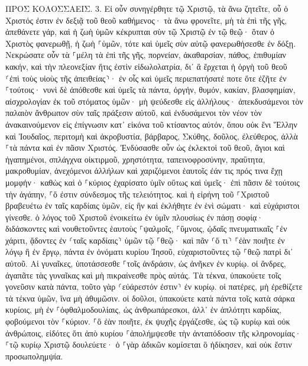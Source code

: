 \documentclass[twoside, 9pt]{extreport}
\begin{document}
ΠΡΟΣ ΚΟΛΟΣΣΑΕΙΣ.
3.
Εἰ οὖν συνηγέρθητε τῷ Χριστῷ, τὰ ἄνω ζητεῖτε, οὗ ὁ Χριστός ἐστιν ἐν δεξιᾷ τοῦ θεοῦ καθήμενος· 
τὰ ἄνω φρονεῖτε, μὴ τὰ ἐπὶ τῆς γῆς, 
ἀπεθάνετε γάρ, καὶ ἡ ζωὴ ὑμῶν κέκρυπται σὺν τῷ Χριστῷ ἐν τῷ θεῷ· 
ὅταν ὁ Χριστὸς φανερωθῇ, ἡ ζωὴ ⸀ὑμῶν, τότε καὶ ὑμεῖς σὺν αὐτῷ φανερωθήσεσθε ἐν δόξῃ. 
Νεκρώσατε οὖν τὰ ⸀μέλη τὰ ἐπὶ τῆς γῆς, πορνείαν, ἀκαθαρσίαν, πάθος, ἐπιθυμίαν κακήν, καὶ τὴν πλεονεξίαν ἥτις ἐστὶν εἰδωλολατρία, 
δι᾽ ἃ ἔρχεται ἡ ὀργὴ τοῦ θεοῦ ⸂ἐπὶ τοὺς υἱοὺς τῆς ἀπειθείας⸃· 
ἐν οἷς καὶ ὑμεῖς περιεπατήσατέ ποτε ὅτε ἐζῆτε ἐν ⸀τούτοις· 
νυνὶ δὲ ἀπόθεσθε καὶ ὑμεῖς τὰ πάντα, ὀργήν, θυμόν, κακίαν, βλασφημίαν, αἰσχρολογίαν ἐκ τοῦ στόματος ὑμῶν· 
μὴ ψεύδεσθε εἰς ἀλλήλους· ἀπεκδυσάμενοι τὸν παλαιὸν ἄνθρωπον σὺν ταῖς πράξεσιν αὐτοῦ, 
καὶ ἐνδυσάμενοι τὸν νέον τὸν ἀνακαινούμενον εἰς ἐπίγνωσιν κατ᾽ εἰκόνα τοῦ κτίσαντος αὐτόν, 
ὅπου οὐκ ἔνι Ἕλλην καὶ Ἰουδαῖος, περιτομὴ καὶ ἀκροβυστία, βάρβαρος, Σκύθης, δοῦλος, ἐλεύθερος, ἀλλὰ ⸀τὰ πάντα καὶ ἐν πᾶσιν Χριστός. 
Ἐνδύσασθε οὖν ὡς ἐκλεκτοὶ τοῦ θεοῦ, ἅγιοι καὶ ἠγαπημένοι, σπλάγχνα οἰκτιρμοῦ, χρηστότητα, ταπεινοφροσύνην, πραΰτητα, μακροθυμίαν, 
ἀνεχόμενοι ἀλλήλων καὶ χαριζόμενοι ἑαυτοῖς ἐάν τις πρός τινα ἔχῃ μομφήν· καθὼς καὶ ὁ ⸀κύριος ἐχαρίσατο ὑμῖν οὕτως καὶ ὑμεῖς· 
ἐπὶ πᾶσιν δὲ τούτοις τὴν ἀγάπην, ⸀ὅ ἐστιν σύνδεσμος τῆς τελειότητος. 
καὶ ἡ εἰρήνη τοῦ ⸀Χριστοῦ βραβευέτω ἐν ταῖς καρδίαις ὑμῶν, εἰς ἣν καὶ ἐκλήθητε ἐν ἑνὶ σώματι· καὶ εὐχάριστοι γίνεσθε. 
ὁ λόγος τοῦ Χριστοῦ ἐνοικείτω ἐν ὑμῖν πλουσίως ἐν πάσῃ σοφίᾳ· διδάσκοντες καὶ νουθετοῦντες ἑαυτοὺς ⸀ψαλμοῖς, ⸀ὕμνοις, ᾠδαῖς πνευματικαῖς ⸀ἐν χάριτι, ᾄδοντες ἐν ⸂ταῖς καρδίαις⸃ ὑμῶν τῷ ⸀θεῷ· 
καὶ πᾶν ⸂ὅ τι⸃ ⸀ἐὰν ποιῆτε ἐν λόγῳ ἢ ἐν ἔργῳ, πάντα ἐν ὀνόματι κυρίου Ἰησοῦ, εὐχαριστοῦντες τῷ ⸀θεῷ πατρὶ δι᾽ αὐτοῦ. 
Αἱ γυναῖκες, ὑποτάσσεσθε ⸀τοῖς ἀνδράσιν, ὡς ἀνῆκεν ἐν κυρίῳ. 
οἱ ἄνδρες, ἀγαπᾶτε τὰς γυναῖκας καὶ μὴ πικραίνεσθε πρὸς αὐτάς. 
Τὰ τέκνα, ὑπακούετε τοῖς γονεῦσιν κατὰ πάντα, τοῦτο γὰρ ⸂εὐάρεστόν ἐστιν⸃ ἐν κυρίῳ. 
οἱ πατέρες, μὴ ἐρεθίζετε τὰ τέκνα ὑμῶν, ἵνα μὴ ἀθυμῶσιν. 
οἱ δοῦλοι, ὑπακούετε κατὰ πάντα τοῖς κατὰ σάρκα κυρίοις, μὴ ἐν ⸀ὀφθαλμοδουλίαις, ὡς ἀνθρωπάρεσκοι, ἀλλ᾽ ἐν ἁπλότητι καρδίας, φοβούμενοι τὸν ⸀κύριον. 
⸀ὃ ἐὰν ποιῆτε, ἐκ ψυχῆς ἐργάζεσθε, ὡς τῷ κυρίῳ καὶ οὐκ ἀνθρώποις, 
εἰδότες ὅτι ἀπὸ κυρίου ⸀ἀπολήμψεσθε τὴν ἀνταπόδοσιν τῆς κληρονομίας· ⸀τῷ κυρίῳ Χριστῷ δουλεύετε· 
ὁ ⸀γὰρ ἀδικῶν κομίσεται ὃ ἠδίκησεν, καὶ οὐκ ἔστιν προσωπολημψία. 
\end{document}
